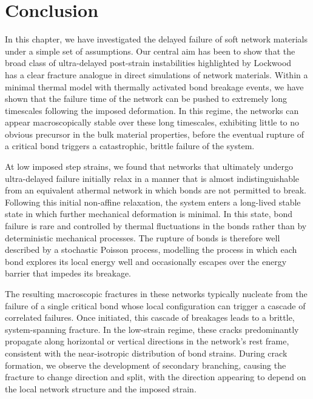 \section{Conclusion}
In this chapter, we have investigated the delayed failure of soft network materials under a simple set of assumptions. Our central aim has been to show that the broad class of ultra-delayed post-strain instabilities highlighted by Lockwood \etal~\cite{lockwood_ultradelayed_2025} has a clear fracture analogue in direct simulations of network materials. Within a minimal thermal model with thermally activated bond breakage events, we have shown that the failure time of the network can be pushed to extremely long timescales following the imposed deformation. In this regime, the networks can appear macroscopically stable over these long timescales, exhibiting little to no obvious precursor in the bulk material properties, before the eventual rupture of a critical bond triggers a catastrophic, brittle failure of the system.

At low imposed step strains, we found that networks that ultimately undergo ultra-delayed failure initially relax in a manner that is almost indistinguishable from an equivalent athermal network in which bonds are not permitted to break. Following this initial non-affine relaxation, the system enters a long-lived stable state in which further mechanical deformation is minimal. In this state, bond failure is rare and controlled by thermal fluctuations in the bonds rather than by deterministic mechanical processes. The rupture of bonds is therefore well described by a stochastic Poisson process, modelling the process in which each bond explores its local energy well and occasionally escapes over the energy barrier that impedes its breakage. 

The resulting macroscopic fractures in these networks typically nucleate from the failure of a single critical bond whose local configuration can trigger a cascade of correlated failures. Once initiated, this cascade of breakages leads to a brittle, system-spanning fracture. In the low-strain regime, these cracks predominantly propagate along horizontal or vertical directions in the network's rest frame, consistent with the near-isotropic distribution of bond strains. During crack formation, we observe the development of secondary branching, causing the fracture to change direction and split, with the direction appearing to depend on the local network structure and the imposed strain. 

